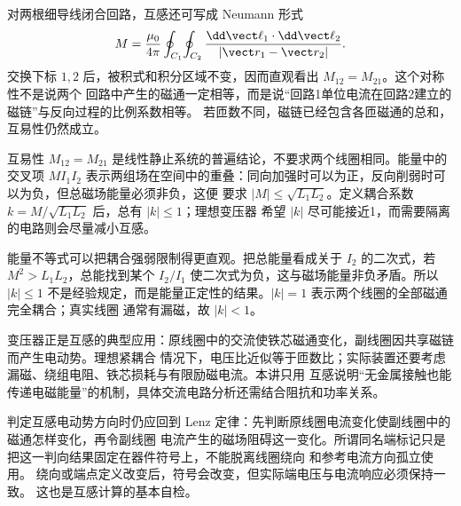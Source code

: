 对两根细导线闭合回路，互感还可写成 Neumann 形式
\begin{equation}
  M=\frac{\mu_0}{4\pi}\oint_{C_1}\!\oint_{C_2}
  \frac{\dd\vect\ell_1\cdot\dd\vect\ell_2}{|\vect r_1-\vect r_2|}.
\end{equation}
交换下标 $1,2$ 后，被积式和积分区域不变，因而直观看出 $M_{12}=M_{21}$。这个对称性不是说两个
回路中产生的磁通一定相等，而是说“回路1单位电流在回路2建立的磁链”与反向过程的比例系数相等。
若匝数不同，磁链已经包含各匝磁通的总和，互易性仍然成立。

互易性 $M_{12}=M_{21}$ 是线性静止系统的普遍结论，不要求两个线圈相同。能量中的交叉项 $MI_1I_2$
表示两组场在空间中的重叠：同向加强时可以为正，反向削弱时可以为负，但总磁场能量必须非负，这便
要求 $|M|\le\sqrt{L_1L_2}$。定义耦合系数 $k=M/\sqrt{L_1L_2}$ 后，总有 $|k|\le1$；理想变压器
希望 $|k|$ 尽可能接近1，而需要隔离的电路则会尽量减小互感。

能量不等式可以把耦合强弱限制得更直观。把总能量看成关于 $I_2$ 的二次式，若
$M^2>L_1L_2$，总能找到某个 $I_2/I_1$ 使二次式为负，这与磁场能量非负矛盾。所以
$|k|\le1$ 不是经验规定，而是能量正定性的结果。$|k|=1$ 表示两个线圈的全部磁通完全耦合；真实线圈
通常有漏磁，故 $|k|<1$。

变压器正是互感的典型应用：原线圈中的交流使铁芯磁通变化，副线圈因共享磁链而产生电动势。理想紧耦合
情况下，电压比近似等于匝数比；实际装置还要考虑漏磁、绕组电阻、铁芯损耗与有限励磁电流。本讲只用
互感说明“无金属接触也能传递电磁能量”的机制，具体交流电路分析还需结合阻抗和功率关系。

判定互感电动势方向时仍应回到 Lenz 定律：先判断原线圈电流变化使副线圈中的磁通怎样变化，再令副线圈
电流产生的磁场阻碍这一变化。所谓同名端标记只是把这一判向结果固定在器件符号上，不能脱离线圈绕向
和参考电流方向孤立使用。
绕向或端点定义改变后，符号会改变，但实际端电压与电流响应必须保持一致。
这也是互感计算的基本自检。

\mutualInductanceDiagram



